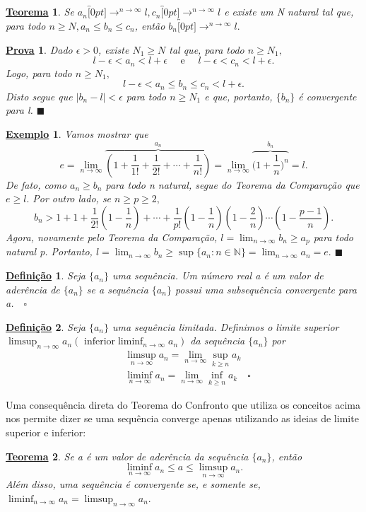 \documentclass{article}
\newtheorem*{def*}{\underline{Defini\c c\~ao}}
\newtheorem*{theorem*}{\underline{Teorema}}
\newtheorem{example}{\underline{Exemplo}}
\newtheorem*{proof*}{\underline{Prova}}
\renewcommand\qedsymbol{$\blacksquare$}
\begin{document}
\begin{theorem*}
  Se $a_{n}\overbracket[0pt]{\longrightarrow}^{n\to \infty}l, c_{n}\overbracket[0pt]{\longrightarrow}^{n\to \infty}l$ e existe um
N natural tal que, para todo $n\geq{N}, a_{n}\leq{b_{n}}\leq{c_{n}}$, ent\~ao $b_{n}\overbracket[0pt]{\longrightarrow}^{n\to \infty}l.$
\end{theorem*}
\begin{proof*}
  Dado $\epsilon>0$, existe $N_{1}\geq{N}$ tal que, para todo $n\geq{N_{1}},$
  $$
    l - \epsilon < a_{n} < l + \epsilon\quad\text{ e }\quad l-\epsilon < c_{n} < l+\epsilon.
  $$
  Logo, para todo $n\geq{N_{1}},$
  $$
    l - \epsilon < a_{n}\leq{b_{n}}\leq{c_{n}}<l + \epsilon.
  $$
  Disto segue que $|b_{n} - l|< \epsilon$ para todo $n\geq{N_{1}}$ e que, portanto, $\{b_{n}\} $ \'e convergente para l. \qedsymbol
\end{proof*}
\begin{example}
  Vamos mostrar que 
  $$
   e = \lim_{n\to\infty}\overbrace{(1 + \frac{1}{1!} + \frac{1}{2!} + \cdots + \frac{1}{n!})}^{a_{n}} = \lim_{n\to\infty}\overbrace{\biggl(1 + \frac{1}{n}\biggr)^{n}}^{b_{n}} = l.
  $$  
  De fato, como $a_{n} \geq{b_{n}}$ para todo n natural, segue do Teorema da Compara\c c\~ao que $e\geq{l}.$ Por outro lado, se 
 $n\geq{p}\geq{2},$
 $$
  b_{n} > 1 + 1 + \frac{1}{2!}(1-\frac{1}{n})+\cdots+\frac{1}{p!}(1-\frac{1}{n})(1-\frac{2}{n})\cdots(1-\frac{p-1}{n}).
 $$
 Agora, novamente pelo Teorema da Compara\c c\~ao, $l = \displaystyle \lim_{n\to\infty}b_{n}\geq{a_{p}}$ para todo natural p.
 Portanto, $l = \displaystyle \lim_{n\to\infty}b_{n}\geq{\sup\{a_{n}:n\in \mathbb{N}\}} = \lim_{n\to\infty}a_{n} = e.$ \qedsymbol
\end{example}
\begin{def*}
   Seja $\{a_{n}\} $ uma sequ\^encia. Um n\'umero real a \'e um valor de ader\^encia de $\{a_{n}\} $ se a sequ\^encia $\{a_{n}\}$ possui
uma subsequ\^encia convergente para a.$\quad\square$
\end{def*}
\begin{def*}
  Seja $\{a_{n}\} $  uma sequ\^encia limitada. Definimos o limite superior $\displaystyle\limsup_{n\to\infty}a_{n}(\text{ inferior}\liminf_{n\to\infty}a_{n})$ da 
sequ\^encia $\{a_{n}\} $ por 
  \begin{align*}
    &\limsup_{n\to\infty}a_{n} = \lim_{n\to\infty}\sup_{k\geq{n}}a_{k}\\
    &\liminf_{n\to\infty}a_{n} = \lim_{n\to\infty}\inf_{k\geq{n}}a_{k}\quad\square
  \end{align*}
\end{def*}
  Uma consequ\^encia direta do Teorema do Confronto que utiliza os conceitos acima nos permite dizer se uma sequ\^encia converge apenas
utilizando as ideias de limite superior e inferior:
 \begin{theorem*}
   Se a \'e um valor de ader\^encia da sequ\^encia $\{a_{n}\} $, ent\~ao
   $$
   \liminf_{n\to\infty}a_{n}\leq{a}\leq{\limsup_{n\to\infty}a_{n}}.
   $$
   Al\'em disso, uma sequ\^encia \'e convergente se, e somente se, $\liminf_{n\to\infty}a_{n} = \limsup_{n\to\infty}a_{n}.$
 \end{theorem*}
\newpage
\end{document}
